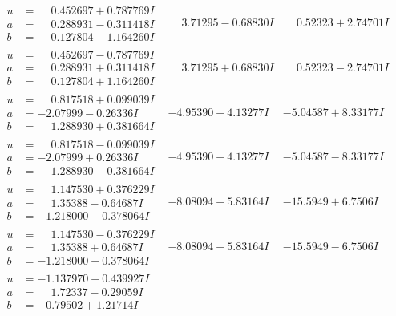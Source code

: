 \documentclass[1p]{elsarticle_modified}
\theoremstyle{definition}
\begin{document}
$$\begin{array}{c|c|c}
\begin{aligned}
u &= \phantom{-}0.452697 + 0.787769 I \\
a &= \phantom{-}0.288931 - 0.311418 I \\
b &= \phantom{-}0.127804 - 1.164260 I\end{aligned}
 & \phantom{-}3.71295 - 0.68830 I & \phantom{-}0.52323 + 2.74701 I \\ \hline\begin{aligned}
u &= \phantom{-}0.452697 - 0.787769 I \\
a &= \phantom{-}0.288931 + 0.311418 I \\
b &= \phantom{-}0.127804 + 1.164260 I\end{aligned}
 & \phantom{-}3.71295 + 0.68830 I & \phantom{-}0.52323 - 2.74701 I \\ \hline\begin{aligned}
u &= \phantom{-}0.817518 + 0.099039 I \\
a &= -2.07999 - 0.26336 I \\
b &= \phantom{-}1.288930 + 0.381664 I\end{aligned}
 & -4.95390 - 4.13277 I & -5.04587 + 8.33177 I \\ \hline\begin{aligned}
u &= \phantom{-}0.817518 - 0.099039 I \\
a &= -2.07999 + 0.26336 I \\
b &= \phantom{-}1.288930 - 0.381664 I\end{aligned}
 & -4.95390 + 4.13277 I & -5.04587 - 8.33177 I \\ \hline\begin{aligned}
u &= \phantom{-}1.147530 + 0.376229 I \\
a &= \phantom{-}1.35388 - 0.64687 I \\
b &= -1.218000 + 0.378064 I\end{aligned}
 & -8.08094 - 5.83164 I & -15.5949 + 6.7506 I \\ \hline\begin{aligned}
u &= \phantom{-}1.147530 - 0.376229 I \\
a &= \phantom{-}1.35388 + 0.64687 I \\
b &= -1.218000 - 0.378064 I\end{aligned}
 & -8.08094 + 5.83164 I & -15.5949 - 6.7506 I \\ \hline\begin{aligned}
u &= -1.137970 + 0.439927 I \\
a &= \phantom{-}1.72337 - 0.29059 I \\
b &= -0.79502 + 1.21714 I\end{aligned}

\end{array}$$
\end{document}
